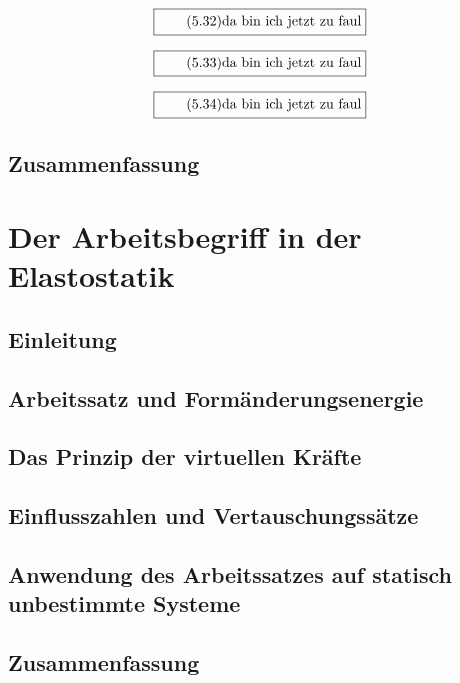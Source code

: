 \documentclass[11pt]{article}
\newcommand{\1}{ {\mathds{1}} }
\begin{document}
\begin{multicols}{2}
		\begin{equation}
			\boxed{
				\tag{5.32}
				\begin{split}
					\text{da bin ich jetzt zu faul}
				\end{split}
			}
		\end{equation}

		\begin{equation}
			\boxed{
				\tag{5.33}
				\begin{split}
					\text{da bin ich jetzt zu faul}
				\end{split}
			}
		\end{equation}

		\begin{equation}
			\boxed{
				\tag{5.34}
				\begin{split}
					\text{da bin ich jetzt zu faul}
				\end{split}
			}
		\end{equation}
		
		\subsection{Zusammenfassung}	

		\section{Der Arbeitsbegriff in der Elastostatik}
		\subsection{Einleitung}
		\subsection{Arbeitssatz und Formänderungsenergie}
		\subsection{Das Prinzip der virtuellen Kräfte}
		\subsection{Einflusszahlen und Vertauschungssätze}
		\subsection{Anwendung des Arbeitssatzes auf statisch unbestimmte Systeme}
		\subsection{Zusammenfassung}


\end{multicols}
\end{document}
